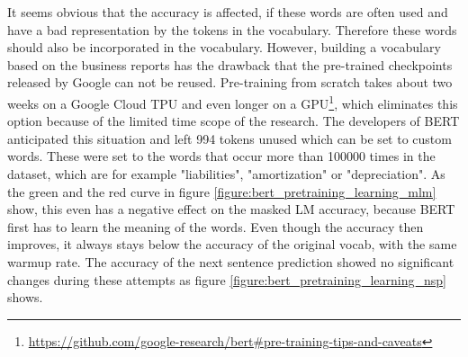 It seems obvious that the accuracy is affected, if these words are often used and have a bad representation by the tokens in the vocabulary.
Therefore these words should also be incorporated in the vocabulary.
However, building a vocabulary based on the business reports has the drawback that the pre-trained checkpoints released by Google can not be reused.
Pre-training from scratch takes about two weeks on a Google Cloud TPU and even longer on a GPU\footnote{\url{https://github.com/google-research/bert\#pre-training-tips-and-caveats}}, which eliminates this option because of the limited time scope of the research.
The developers of \ac{BERT} anticipated this situation and left 994 tokens unused which can be set to custom words.
These were set to the words that occur more than 100000 times in the dataset, which are for example "liabilities", "amortization" or "depreciation".
As the green and the red curve in figure \ref{figure:bert_pretraining_learning_mlm} show, this even has a negative effect on the masked LM accuracy, because \ac{BERT} first has to learn the meaning of the words.
Even though the accuracy then improves, it always stays below the accuracy of the original vocab, with the same warmup rate.
The accuracy of the next sentence prediction showed no significant changes during these attempts as figure \ref{figure:bert_pretraining_learning_nsp} shows.


